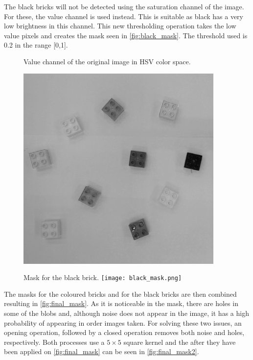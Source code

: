 The black bricks will not be detected using the saturation channel of the image. For these, the value channel is used instead. This is suitable as black has a very low brightness in this channel. This new thresholding operation takes the low value pixels and creates the mask seen in \autoref{fig:black_mask}. The threshold used is 0.2 in the range [0,1].
\begin{figure}[H]
	\captionbox  %
	{
		Value channel of the original image in HSV color space.                
		\label{fig:value}                                  
	}                                                                 
	{       
		
		\includegraphics[width=.25\textwidth]{figures/value.png}         
	}                                                                    
	\hspace{5pt}                                                          
	\captionbox
	{  
		Mask for the black brick.
		\label{fig:black_mask}                                     
	}
	{
		\texttt{[image: black\_mask.png]}            
	}                                                                             
\end{figure}
The masks for the coloured bricks and for the black bricks are then combined resulting in \autoref{fig:final_mask}. As it is noticeable in the mask, there are holes in some of the blobs and, although noise does not appear in the image, it has a high probability of appearing in order images taken. For solving these two issues, an opening operation, followed by a closed operation removes both noise and holes, respectively. Both processes use a $5\times 5$ square kernel and the after they have been applied on \autoref{fig:final_mask} can be seen in \autoref{fig:final_mask2}. 


